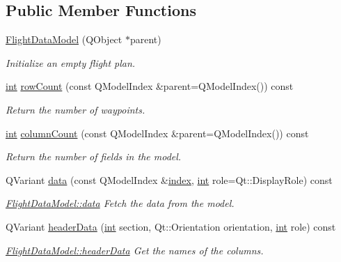 \subsection*{Public Member Functions}
\begin{DoxyCompactItemize}
\item 
\hyperlink{group___path_ga777bf842aa77abc4db16f1275fac0df0}{Flight\-Data\-Model} (Q\-Object $\ast$parent)
\begin{DoxyCompactList}\small\item\em Initialize an empty flight plan. \end{DoxyCompactList}\item 
\hyperlink{ioapi_8h_a787fa3cf048117ba7123753c1e74fcd6}{int} \hyperlink{group___path_ga7c8a098e7b8a37867261f0036502a4fc}{row\-Count} (const Q\-Model\-Index \&parent=Q\-Model\-Index()) const 
\begin{DoxyCompactList}\small\item\em Return the number of waypoints. \end{DoxyCompactList}\item 
\hyperlink{ioapi_8h_a787fa3cf048117ba7123753c1e74fcd6}{int} \hyperlink{group___path_gab6781580d20ed0e89768eafa799856d4}{column\-Count} (const Q\-Model\-Index \&parent=Q\-Model\-Index()) const 
\begin{DoxyCompactList}\small\item\em Return the number of fields in the model. \end{DoxyCompactList}\item 
Q\-Variant \hyperlink{group___path_ga3314e011bb5ed88b34ab33bf8f94d41e}{data} (const Q\-Model\-Index \&\hyperlink{glext_8h_ab47dd9958bcadea08866b42bf358e95e}{index}, \hyperlink{ioapi_8h_a787fa3cf048117ba7123753c1e74fcd6}{int} role=Qt\-::\-Display\-Role) const 
\begin{DoxyCompactList}\small\item\em \hyperlink{group___path_ga3314e011bb5ed88b34ab33bf8f94d41e}{Flight\-Data\-Model\-::data} Fetch the data from the model. \end{DoxyCompactList}\item 
Q\-Variant \hyperlink{group___path_gaa4c59e9669bd77cd6475133fcf529bad}{header\-Data} (\hyperlink{ioapi_8h_a787fa3cf048117ba7123753c1e74fcd6}{int} section, Qt\-::\-Orientation orientation, \hyperlink{ioapi_8h_a787fa3cf048117ba7123753c1e74fcd6}{int} role) const 
\begin{DoxyCompactList}\small\item\em \hyperlink{group___path_gaa4c59e9669bd77cd6475133fcf529bad}{Flight\-Data\-Model\-::header\-Data} Get the names of the columns. \end{DoxyCompactList}\item 

\end{DoxyCompactItemize}
